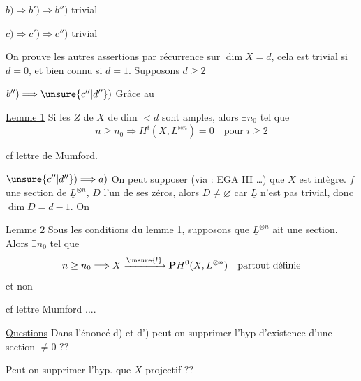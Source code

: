 $b)\Longrightarrow b')\Longrightarrow b'')$ trivial

$c)\Longrightarrow c')\Longrightarrow c'')$ trivial

On prouve les autres assertions par récurrence sur  $\dim X=d$, cela est trivial si $d=0$, et bien connu si $d=1$. Supposons $d\geq2$

$b'')\Longrightarrow\unsure{c''|d''})$ Grâce au

\uline{Lemme 1} Si les  $Z$ de $X$ de dim $<d$ sont amples, alors $\exists n_0$ tel que
\[
n\geq n_0\Longrightarrow H^i(X,L^{\otimes n})=0\quad\text{pour }i\geq2
\]


cf lettre de Mumford.



$\unsure{c''|d''})\Longrightarrow a)$ On peut supposer (via : EGA III \ldots) que $X$ est intègre.    $f$ une section de $\underline L^{\otimes n}$,  $D$ l'un de ses zéros, alors $D\neq\varnothing$ car $\underline L$ n'est pas trivial, donc $\dim D=d-1$. On 

\uline{Lemme 2} Sous les conditions du lemme 1, supposons  que $\underline L^{\otimes n}$ ait une section. Alors \deleted{$\unsure{\exists}$} $\exists n_0$ tel que
\[
n\geq n_0\Longrightarrow X\xrightarrow{\unsure{!}}\mathbf P H^0(X,L^{\otimes n})\quad\text{partout définie}
\]
et non 


cf lettre Mumford ....

\uline{Questions} Dans l'énoncé d) et d') peut-on supprimer l'hyp d'existence d'une section $\neq0$ ?? 

 Peut-on supprimer l'hyp. que $X$ projectif ??


